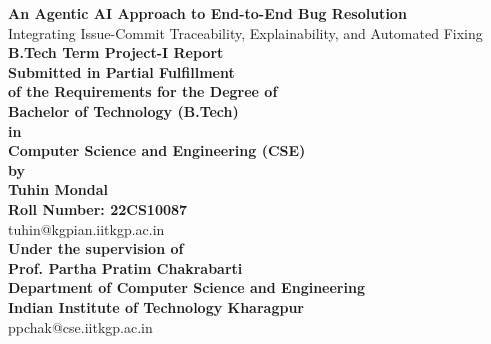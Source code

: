 \begin{titlepage}
\begin{center}
    \textbf{\fontsize{17.28pt}{14pt}\selectfont An Agentic AI Approach to End-to-End Bug Resolution} \\
    \vspace{0.1in}
    \fontsize{14pt}{14pt}\selectfont Integrating Issue-Commit Traceability, Explainability, and Automated Fixing\\
    \vspace{0.6in}
    {\fontsize{15pt}{14pt} \textbf{B.Tech Term Project-I Report \\}}        
    \vspace{0.5in}
    {\large\bf Submitted in Partial Fulfillment\\ of the Requirements for the Degree of}\\
     \vspace{0.3in}
     {\large\bf Bachelor of Technology (B.Tech)}\\
     {\large\bf in}\\
     {\large\bf Computer Science and Engineering (CSE)}\\     
    \vspace{0.5in}
    {\large\bf by}\\
    \vspace{0.3in}
    {\Large\bf Tuhin Mondal}\\
    \vspace{0.1in}
    {\Large\bf Roll Number: 22CS10087}\\
    \vspace{0.05in}
    {tuhin@kgpian.iitkgp.ac.in\\}
    \vspace{0.5in}
    {\large\bf Under the supervision of}\\
    \vspace{0.2in}
     {\Large\bf  Prof. Partha Pratim Chakrabarti}\\
    \vspace{0.1in}
    {\large\bf Department of Computer Science and Engineering}\\
    {\large\bf Indian Institute of Technology Kharagpur}\\  
    \vspace{0.05in}
    {ppchak@cse.iitkgp.ac.in}\\
    

\end{center}
\end{titlepage}
